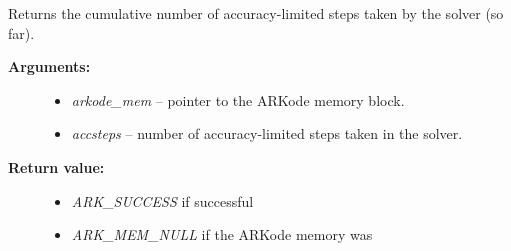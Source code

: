 \documentclass[letterpaper,10pt,english]{sphinxmanual}
\begin{document}

\begin{fulllineitems}
\label{c_interface/User_callable:c.ARKodeGetNumAccSteps}
Returns the cumulative number of accuracy-limited steps
taken by the solver (so far).
\begin{description}
\item[{\textbf{Arguments:}}] \leavevmode\begin{itemize}
\item {} 
\emph{arkode\_mem} -- pointer to the ARKode memory block.

\item {} 
\emph{accsteps} -- number of accuracy-limited steps taken in the solver.

\end{itemize}

\item[{\textbf{Return value:}}] \leavevmode\begin{itemize}
\item {} 
\emph{ARK\_SUCCESS} if successful

\item {} 
\emph{ARK\_MEM\_NULL} if the ARKode memory was 

\end{itemize}

\end{description}

\end{fulllineitems}

\end{document}
